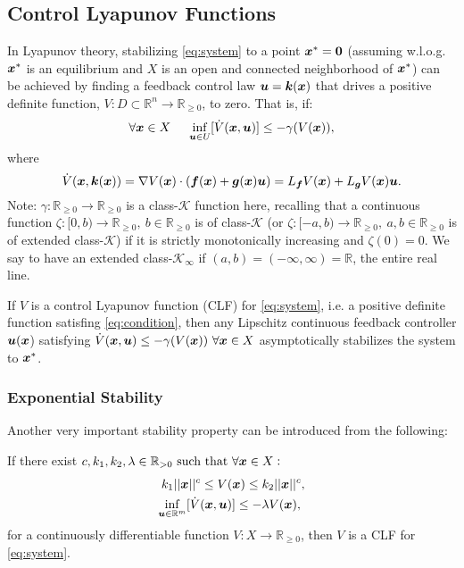 \subsection{Control Lyapunov Functions}
In Lyapunov theory, stabilizing \eqref{eq:system} to a point $\boldsymbol{x}^*=\boldsymbol{0}$ (assuming w.l.o.g.
$\boldsymbol{x}^*$ is an equilibrium and 
$X$ is an open and connected neighborhood of $\boldsymbol{x}^*$) can be achieved by finding a feedback control law $\boldsymbol{u}=\boldsymbol{k}(\boldsymbol{x})$ that drives a positive definite function, $V: D \subset \mathbb{R}^n \to \mathbb{R}_{\geq 0}$, to zero. That is, if:
\begin{equation}
    \forall \boldsymbol{x}\in X ~~~~ \inf_{\boldsymbol{u}\in U}[\dot{V}(\boldsymbol{x},\boldsymbol{u})] \leq -\gamma(V(\boldsymbol{x})),
\label{eq:condition}
\end{equation}
where
\begin{equation}
    \dot{V}(\boldsymbol{x},\boldsymbol{k}(\boldsymbol{x})) = \nabla V(\boldsymbol{x})\cdot(\boldsymbol{f}(\boldsymbol{x})+\boldsymbol{g}(\boldsymbol{x})\boldsymbol{u})= L_{\boldsymbol{f}}V(\boldsymbol{x})+L_{\boldsymbol{g}}V(\boldsymbol{x})\boldsymbol{u}.
\label{eq:vdot}
\end{equation}
Note: $\gamma : \mathbb{R}_{\geq 0} \to \mathbb{R}_{\geq 0} $ is a class-$\mathcal{K}$ function here, 
recalling that a continuous function $\zeta : [0, b) \to \mathbb{R}_{\geq 0},~b \in \mathbb{R}_{\geq 0}$ is of class-$\mathcal{K}$ (or $\zeta : [-a, b) \to \mathbb{R}_{\geq 0},~a,b \in \mathbb{R}_{\geq 0}$ is of extended class-$\mathcal{K}$) if it is strictly monotonically increasing and $\zeta(0) = 0$. We say to have an extended class-$\mathcal{K}_\infty$ if $(a,b) = (-\infty, \infty) = \mathbb{R}$, the entire real line.
\begin{theorem}\label{th:clft}
If $V$ is a control Lyapunov function (CLF) for \eqref{eq:system}, i.e. a positive definite function satisfing \eqref{eq:condition}, then any Lipschitz continuous feedback controller $\boldsymbol{u}(\boldsymbol{x}$) satisfying $\dot{V}(\boldsymbol{x},\boldsymbol{u}) \leq -\gamma(V(\boldsymbol{x}))~\forall \boldsymbol{x}\in X$ asymptotically stabilizes the system to $\boldsymbol{x}^*$.
\end{theorem}
\subsubsection{Exponential Stability}
Another very important stability property can be introduced from the following:
\begin{definition}
If there exist $c,k_1,k_2,\lambda \in \mathbb{R}_{> 0} \text{~such that~} \forall \boldsymbol{x} \in X:$ 
\begin{equation}
    \begin{split}
    k_1||\boldsymbol{x}||^c \leq V(\boldsymbol{x}) \leq k_2||\boldsymbol{x}||^c,  \\
    \inf_{{\boldsymbol{u}\in \mathbb{R}^m}}[\dot{V}(\boldsymbol{x},\boldsymbol{u})] \leq -\lambda V(\boldsymbol{x}),~
    \end{split}
    \label{eq:expstabcond}
\end{equation}
for a continuously differentiable function $V : X \to \mathbb{R}_{\geq 0}$, then $V$ is a CLF for \eqref{eq:system}.
\label{def:expclf}
\end{definition}


